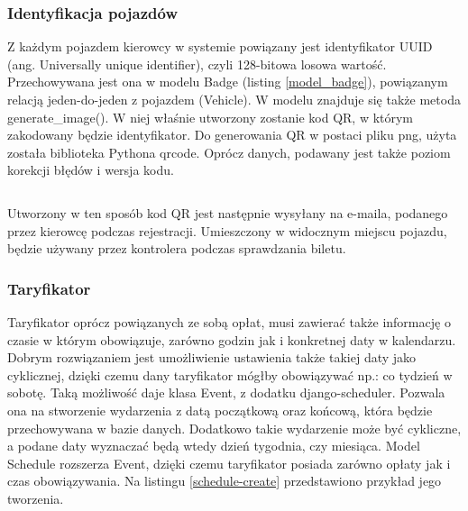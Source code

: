 \subsubsection*{Identyfikacja pojazdów}

Z każdym pojazdem kierowcy w systemie powiązany jest identyfikator UUID (ang. Universally unique identifier), czyli 128-bitowa losowa wartość. Przechowywana jest ona w modelu Badge (listing \ref{model_badge}), powiązanym relacją jeden-do-jeden z pojazdem (Vehicle). W modelu znajduje się także metoda generate\_image(). W niej właśnie utworzony zostanie kod QR, w którym zakodowany będzie identyfikator. Do generowania QR w postaci pliku png, użyta została biblioteka Pythona qrcode. Oprócz danych, podawany jest także poziom korekcji błędów i wersja kodu.

\begin{singlespace}
	\label{model_badge}
	\vspace{0.3cm}
	\inputminted[fontsize=\footnotesize, linenos=true]{python}{src/imp/badges-badge.py}
\end{singlespace}

\vspace{0.3cm}

Utworzony w ten sposób kod QR jest następnie wysyłany na e-maila, podanego przez kierowcę podczas rejestracji. Umieszczony w widocznym miejscu pojazdu, będzie używany przez kontrolera podczas sprawdzania biletu.

\subsubsection*{Taryfikator}

Taryfikator oprócz powiązanych ze sobą opłat, musi zawierać także informację o czasie w którym obowiązuje, zarówno godzin jak i konkretnej daty w kalendarzu. Dobrym rozwiązaniem jest umożliwienie ustawienia także takiej daty jako cyklicznej, dzięki czemu dany taryfikator mógłby obowiązywać np.: co tydzień w sobotę. Taką możliwość daje klasa Event, z dodatku django-scheduler. Pozwala ona na stworzenie wydarzenia z datą początkową oraz końcową, która będzie przechowywana w bazie danych. Dodatkowo takie wydarzenie może być cykliczne, a podane daty wyznaczać będą wtedy dzień tygodnia, czy miesiąca. Model Schedule rozszerza Event, dzięki czemu taryfikator posiada zarówno opłaty jak i czas obowiązywania. Na listingu \ref{schedule-create} przedstawiono przykład jego tworzenia.

